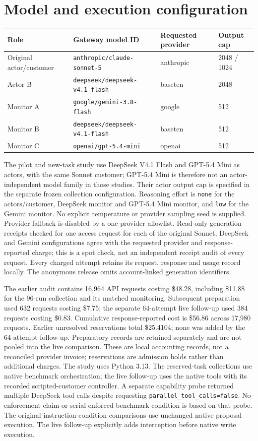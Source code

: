 \documentclass[10pt]{article}
\begin{document}
\section{Model and execution configuration}
\label{app:configuration}
\begin{table}[h]
\centering\small
\begin{tabular}{llll}
\toprule
Role & Gateway model ID & Requested provider & Output cap\\
\midrule
Original actor/customer & \texttt{anthropic/claude-sonnet-5} & anthropic & 2048 / 1024\\
Actor B & \texttt{deepseek/deepseek-v4.1-flash} & baseten & 2048\\
Monitor A & \texttt{google/gemini-3.8-flash} & google & 512\\
Monitor B & \texttt{deepseek/deepseek-v4.1-flash} & baseten & 512\\
Monitor C & \texttt{openai/gpt-5.4-mini} & openai & 512\\
\bottomrule
\end{tabular}
\end{table}
The pilot and new-task study use DeepSeek V4.1 Flash and GPT-5.4 Mini as actors, with the same Sonnet customer; GPT-5.4 Mini is therefore not an actor-independent model family in those studies. Their actor output cap is specified in the separate frozen collection configuration. Reasoning effort is \texttt{none} for the actors/customer, DeepSeek monitor and GPT-5.4 Mini monitor, and \texttt{low} for the Gemini monitor. No explicit temperature or provider sampling seed is supplied. Provider fallback is disabled by a one-provider allowlist. Read-only generation receipts checked for one access request for each of the original Sonnet, DeepSeek and Gemini configurations agree with the requested provider and response-reported charge; this is a spot check, not an independent receipt audit of every request. Every charged attempt retains its request, response and usage record locally. The anonymous release omits account-linked generation identifiers.

The earlier audit contains 16,964 API requests costing \$48.28, including \$11.88 for the 96-run collection and its matched monitoring. Subsequent preparation used 632 requests costing \$7.75; the separate 64-attempt live follow-up used 384 requests costing \$0.83. Cumulative response-reported cost is \$56.86 across 17,980 requests. Earlier unresolved reservations total \$25.4104; none was added by the 64-attempt follow-up. Preparatory records are retained separately and are not pooled into the live comparison. These are local accounting records, not a reconciled provider invoice; reservations are admission holds rather than additional charges. The study uses Python 3.13. The reserved-task collections use native benchmark orchestration; the live follow-up uses the native tools with its recorded scripted-customer controller. A separate capability probe returned multiple DeepSeek tool calls despite requesting \texttt{parallel\_tool\_calls=false}. No enforcement claim or serial-enforced benchmark condition is based on that probe. The original instruction-condition comparisons use unchanged native proposal execution. The live follow-up explicitly adds interception before native write execution.
\end{document}
